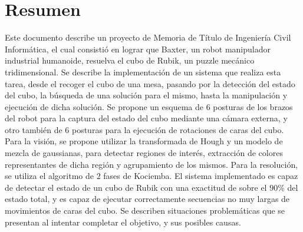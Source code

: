 

\chapter*{Resumen}
\label{cha:abstract}

Este documento describe un proyecto de Memoria de Título de Ingeniería Civil Informática, el cual consistió en lograr que Baxter, un robot manipulador industrial humanoide, resuelva el cubo de Rubik, un puzzle mecánico tridimensional. Se describe la implementación de un sistema que realiza esta tarea, desde el recoger el cubo de una mesa, pasando por la detección del estado del cubo, la búsqueda de una solución para el mismo, hasta la manipulación y ejecución de dicha solución. Se propone un esquema de 6 posturas de los brazos del robot para la captura del estado del cubo mediante una cámara externa, y otro también de 6 posturas para la ejecución de rotaciones de caras del cubo. Para la visión, se propone utilizar la transformada de Hough y un modelo de mezcla de gaussianas, para detectar regiones de interés, extracción de colores representantes de dicha región y agrupamiento de los mismos. Para la resolución, se utiliza el algoritmo de $2$ fases de Kociemba. El sistema implementado es capaz de detectar el estado de un cubo de Rubik con una exactitud de sobre el $90$\% del estado total, y es capaz de ejecutar correctamente secuencias no muy largas de movimientos de caras del cubo. Se describen situaciones problemáticas que se presentan al intentar completar el objetivo, y sus posibles causas.


